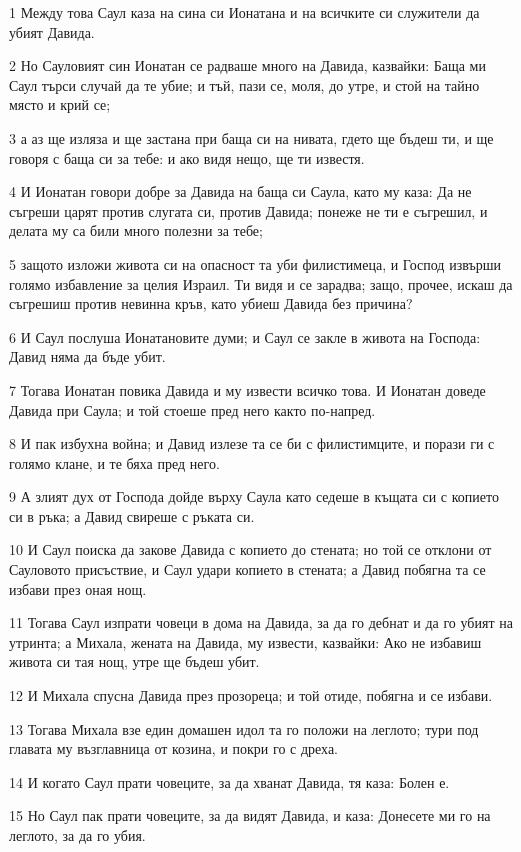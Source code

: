 \par 1 Между това Саул каза на сина си Ионатана и на всичките си служители да убият Давида.
\par 2 Но Сауловият син Ионатан се радваше много на Давида, казвайки: Баща ми Саул търси случай да те убие; и тъй, пази се, моля, до утре, и стой на тайно място и крий се;
\par 3 а аз ще изляза и ще застана при баща си на нивата, гдето ще бъдеш ти, и ще говоря с баща си за тебе: и ако видя нещо, ще ти известя.
\par 4 И Ионатан говори добре за Давида на баща си Саула, като му каза: Да не съгреши царят против слугата си, против Давида; понеже не ти е съгрешил, и делата му са били много полезни за тебе;
\par 5 защото изложи живота си на опасност та уби филистимеца, и Господ извърши голямо избавление за целия Израил. Ти видя и се зарадва; защо, прочее, искаш да съгрешиш против невинна кръв, като убиеш Давида без причина?
\par 6 И Саул послуша Ионатановите думи; и Саул се закле в живота на Господа: Давид няма да бъде убит.
\par 7 Тогава Ионатан повика Давида и му извести всичко това. И Ионатан доведе Давида при Саула; и той стоеше пред него както по-напред.
\par 8 И пак избухна война; и Давид излезе та се би с филистимците, и порази ги с голямо клане, и те бяха пред него.
\par 9 А злият дух от Господа дойде върху Саула като седеше в къщата си с копието си в ръка; а Давид свиреше с ръката си.
\par 10 И Саул поиска да закове Давида с копието до стената; но той се отклони от Сауловото присъствие, и Саул удари копието в стената; а Давид побягна та се избави през оная нощ.
\par 11 Тогава Саул изпрати човеци в дома на Давида, за да го дебнат и да го убият на утринта; а Михала, жената на Давида, му извести, казвайки: Ако не избавиш живота си тая нощ, утре ще бъдеш убит.
\par 12 И Михала спусна Давида през прозореца; и той отиде, побягна и се избави.
\par 13 Тогава Михала взе един домашен идол та го положи на леглото; тури под главата му възглавница от козина, и покри го с дреха.
\par 14 И когато Саул прати човеците, за да хванат Давида, тя каза: Болен е.
\par 15 Но Саул пак прати човеците, за да видят Давида, и каза: Донесете ми го на леглото, за да го убия.
